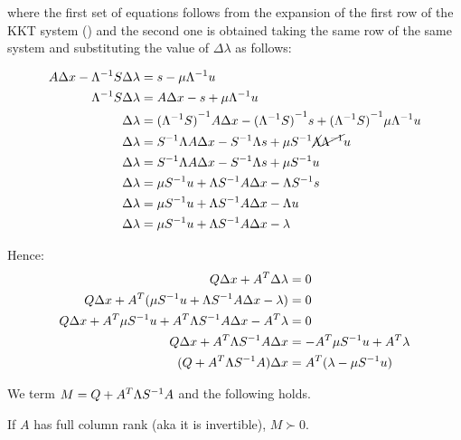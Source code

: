 \documentclass[ComputationalMathematics.tex]{subfiles}
\begin{document}
where the first set of equations follows from the expansion of the first row of the KKT system () and the second one is obtained taking the same row of the same system and substituting the value of $\Delta \lambda$ as follows:

\begin{equation}
  \begin{split}
    A \Delta x - {\Lambda}^{-1} S \Delta \lambda &= s - \mu {\Lambda}^{-1} u\\
    {\Lambda}^{-1} S \Delta \lambda &= A \Delta x - s + \mu {\Lambda}^{-1} u\\
    \Delta \lambda &= {({\Lambda}^{-1} S)}^{-1} A \Delta x - {({\Lambda}^{-1} S)}^{-1}s + {({\Lambda}^{-1} S)}^{-1}\mu {\Lambda}^{-1} u\\
    \Delta \lambda &= {S}^{-1} \Lambda A \Delta x - {S}^{-1} \Lambda s + \mu {S}^{-1} \cancel{\Lambda} \cancel{{\Lambda}^{-1}} u\\
    \Delta \lambda &= {S}^{-1} \Lambda A \Delta x - {S}^{-1} \Lambda s + \mu {S}^{-1} u\\
    \Delta \lambda &= \mu {S}^{-1} u + \Lambda {S}^{-1} A \Delta x - \Lambda {S}^{-1} s\\
    \Delta \lambda &= \mu {S}^{-1} u + \Lambda {S}^{-1} A \Delta x - \Lambda u\\
    \Delta \lambda &= \mu {S}^{-1} u + \Lambda {S}^{-1} A \Delta x - \lambda\\
  \end{split}
\end{equation}

Hence:
\begin{equation}
  \begin{split}
    Q \Delta x + {A}^{T} \Delta \lambda &= 0\\
    Q \Delta x + {A}^{T} (\mu S^{-1} u + \Lambda S^{-1} A \Delta x - \lambda) &= 0\\
    Q \Delta x + {A}^{T} \mu S^{-1} u + {A}^{T} \Lambda S^{-1} A \Delta x - {A}^{T} \lambda &= 0\\
    Q \Delta x + {A}^{T} \Lambda S^{-1} A \Delta x &= - {A}^{T} \mu S^{-1} u + {A}^{T} \lambda\\
    (Q + {A}^{T} \Lambda {S}^{-1} A) \Delta x &= {A}^{T} (\lambda - \mu S^{-1} u)\\
  \end{split}
\end{equation}
 
We term $M = Q + {A}^{T} \Lambda {S}^{-1} A$ and the following holds.

\begin{proposition}
  If $A$ has full column rank (aka it is invertible), $M \succ 0$.
\end{proposition}
\end{document}
